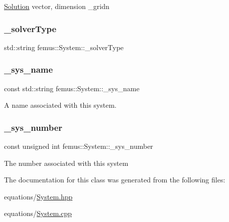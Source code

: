 \mbox{\hyperlink{classfemus_1_1_solution}{Solution}} vector, dimension \+\_\+gridn \mbox{\label{classfemus_1_1_system_af26639b99612eb2307723359124e32cd}} 
\subsubsection{\texorpdfstring{\+\_\+solver\+Type}{\_solverType}}
{\footnotesize\ttfamily std\+::string femus\+::\+System\+::\+\_\+solver\+Type\hspace{0.3cm}{\ttfamily [protected]}}

\mbox{\label{classfemus_1_1_system_a1179f082cb14d4f3c82c699bbbb0f870}} 
\subsubsection{\texorpdfstring{\+\_\+sys\+\_\+name}{\_sys\_name}}
{\footnotesize\ttfamily const std\+::string femus\+::\+System\+::\+\_\+sys\+\_\+name\hspace{0.3cm}{\ttfamily [protected]}}

A name associated with this system. \mbox{\label{classfemus_1_1_system_ae24afc2eadae2253268bc9442f2a02e3}} 
\subsubsection{\texorpdfstring{\+\_\+sys\+\_\+number}{\_sys\_number}}
{\footnotesize\ttfamily const unsigned int femus\+::\+System\+::\+\_\+sys\+\_\+number\hspace{0.3cm}{\ttfamily [protected]}}

The number associated with this system 

The documentation for this class was generated from the following files\+:\begin{DoxyCompactItemize}
\item 
equations/\mbox{\hyperlink{_system_8hpp}{System.\+hpp}}\item 
equations/\mbox{\hyperlink{_system_8cpp}{System.\+cpp}}\end{DoxyCompactItemize}

